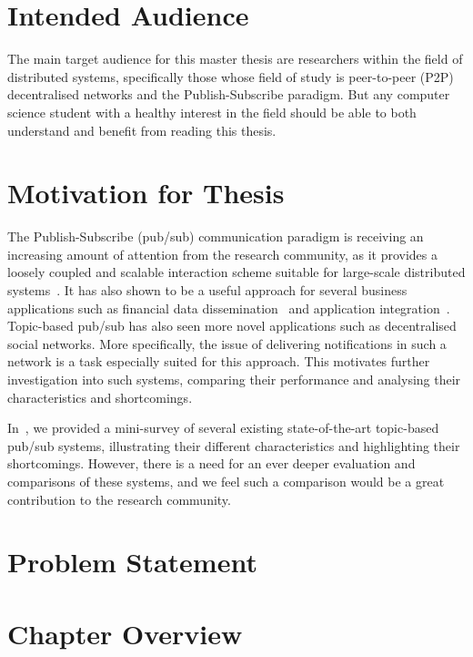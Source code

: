 \section{Intended Audience}

The main target audience for this master thesis are researchers within
the field of distributed systems, specifically those whose field of
study is peer-to-peer (P2P) decentralised networks and the
Publish-Subscribe paradigm. But any computer science student with a
healthy interest in the field should be able to both understand and
benefit from reading this thesis.


\section{Motivation for Thesis}

The Publish-Subscribe (pub/sub) communication paradigm is receiving an
increasing amount of attention from the research community, as it
provides a loosely coupled and scalable interaction scheme suitable for
large-scale distributed systems~\cite{Eugster:2003}. It has also shown
to be a useful approach for several business applications such as
financial data dissemination~\cite{tibcorv} and application
integration~\cite{goops}.  Topic-based pub/sub has also seen more novel
applications such as decentralised social networks. More specifically,
the issue of delivering notifications in such a network is a task
especially suited for this approach. This motivates further
investigation into such systems, comparing their performance and
analysing their characteristics and shortcomings.

In~\cite{Setty:2012}, we provided a mini-survey of several existing
state-of-the-art topic-based pub/sub systems, illustrating their
different characteristics and highlighting their shortcomings. However,
there is a need for an ever deeper evaluation and comparisons of these
systems, and we feel such a comparison would be a great contribution to
the research community.

\section{Problem Statement}


\section{Chapter Overview}

